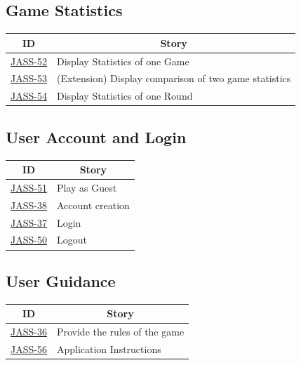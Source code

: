 \subsection{Game Statistics}
\begin{tabular} { | m{1.75 cm} | m{5.25cm} | }
    \hline
    \multicolumn{1}{|c|}{ \textbf{ID}} & \multicolumn{1}{|c|}{ \textbf{Story} }  \\
    \hline
    \href{https://jasstracker-jira.atlassian.net/browse/JASS-52}{JASS-52} & Display Statistics of one Game \\
    \hline
    \href{https://jasstracker-jira.atlassian.net/browse/JASS-53}{JASS-53} & (Extension) Display comparison of two game statistics \\
    \hline
    \href{https://jasstracker-jira.atlassian.net/browse/JASS-54}{JASS-54} & Display Statistics of one Round \\
    \hline
\end{tabular}

\subsection{User Account and Login}
\begin{tabular} { | m{1.75 cm} | m{5.25cm} | }
    \hline
    \multicolumn{1}{|c|}{ \textbf{ID}} & \multicolumn{1}{|c|}{ \textbf{Story} }  \\
    \hline
    \href{https://jasstracker-jira.atlassian.net/browse/JASS-51}{JASS-51} & Play as Guest \\
    \hline
    \href{https://jasstracker-jira.atlassian.net/browse/JASS-38}{JASS-38} & Account creation \\
    \hline
    \href{https://jasstracker-jira.atlassian.net/browse/JASS-37}{JASS-37} & Login \\
    \hline
    \href{https://jasstracker-jira.atlassian.net/browse/JASS-50}{JASS-50} & Logout \\
    \hline
\end{tabular}

\subsection{User Guidance}
\begin{tabular} { | m{1.75 cm} | m{5.25cm} | }
    \hline
    \multicolumn{1}{|c|}{ \textbf{ID}} & \multicolumn{1}{|c|}{ \textbf{Story} }  \\
    \hline
    \href{https://jasstracker-jira.atlassian.net/browse/JASS-36}{JASS-36} & Provide the rules of the game \\
    \hline
    \href{https://jasstracker-jira.atlassian.net/browse/JASS-56}{JASS-56} & Application Instructions \\
    \hline
\end{tabular}

